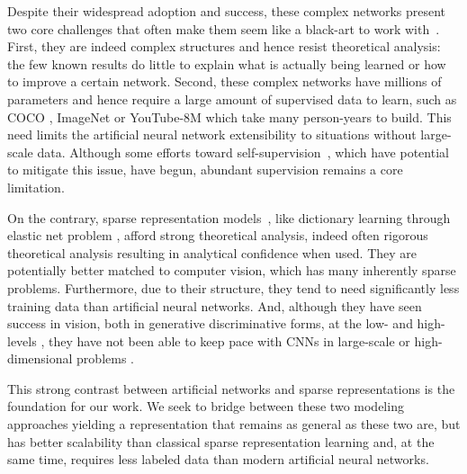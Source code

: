 \documentclass[10pt,twocolumn,letterpaper]{article}
\begin{document}
Despite their widespread adoption and success, these complex networks present 
two core challenges that often make them seem like a black-art to work 
with~\cite{orr2003neural,NgYoClCVPR2015}.  First, they are indeed complex 
structures and hence resist theoretical analysis: the few known results 
\cite{hornik1989multilayer,MaSIAMJC1997} do little to explain what is actually 
being learned or how to improve a certain network.  Second, these complex 
networks have millions of parameters and hence require a large amount of 
supervised data to learn, such as COCO \cite{LiMaBeECCV2014}, ImageNet 
\cite{DeDoSoCVPR2009} or YouTube-8M \cite{youtube8m} which take many 
person-years to build.  This need limits the artificial neural network 
extensibility to situations without large-scale data.  Although some efforts 
toward self-supervision~\cite{Vondrick_2016_CVPR}, which have potential to 
mitigate this issue, have begun, abundant supervision remains a core 
limitation.

On the contrary, sparse representation models~\cite{ElBOOK2010}, like 
dictionary learning through elastic net problem \cite{ZoHaJRSS2005}, afford 
strong theoretical analysis, indeed often rigorous theoretical analysis 
resulting in analytical confidence when used.  They are potentially better 
matched to computer vision, which has many inherently sparse problems.  
Furthermore, due to their structure, they tend to need significantly less training 
data than artificial neural networks.  And, although they have seen success in 
vision, both in generative \cite{YuLiLaCVPR2011} discriminative 
\cite{zhang2010discriminative} forms, at the low- \cite{mairal2008sparse} and 
high-levels \cite{luo2013group}, they have not been able to keep pace with CNNs 
in large-scale or high-dimensional problems \cite{RuDeSuIJCV2015}.



This strong contrast between artificial networks and sparse representations is 
the foundation for our work.  We seek to bridge between these two modeling 
approaches yielding a representation that remains as general as these two are, 
but has better scalability than classical sparse representation learning and, 
at the same time, requires less labeled data than modern artificial neural 
networks.  
\end{document}
